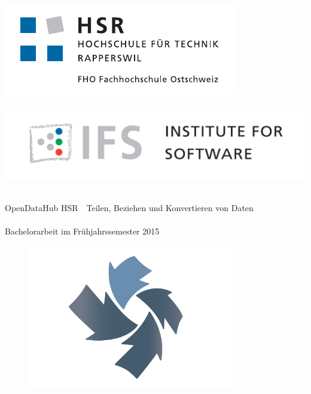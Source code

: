 
\author{
	\rlif \\
	\and
	\chuf \\
	\and
	\fscf \\
}

\clearpage
\begin{titlepage}
	\begin{minipage}{0.4\textwidth}
		\includegraphics[width=\textwidth]{fig/hsr-logo}
	\end{minipage}
	\hfill
	\begin{minipage}[b]{0.4\textwidth}
		\includegraphics[width=\textwidth]{fig/ifs-logo}
	\end{minipage}

	\begin{center}
		\hr{1pt} \\[0.2cm]
		\huge OpenDataHub HSR\ \textendash \ Teilen, Beziehen und Konvertieren von Daten \\
		\hr{1pt} \\[0.2cm]
		\Large{Bachelorarbeit im Frühjahrssemester 2015} \\ [25pt]
		\begin{figure}[H]
			\centering
			\includegraphics[width=0.8\textwidth]{fig/logo-odh}
		\end{figure}
		\vfill
	\end{center}
	

\end{titlepage}
